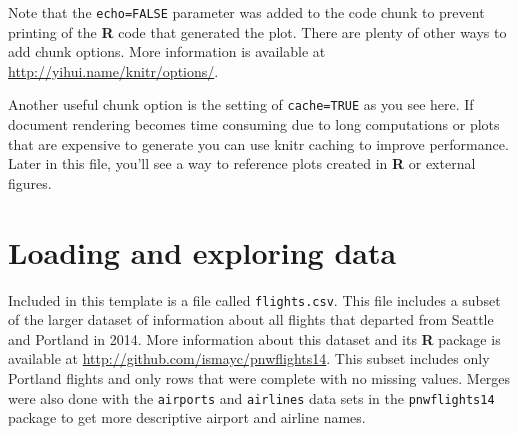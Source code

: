 \documentclass [11pt, proquest] {uwthesis}[2015/03/03]
\begin{document}
Note that the \texttt{echo=FALSE} parameter was added to the code chunk to prevent printing of the \textbf{R} code that generated the plot. There are plenty of other ways to add chunk options. More information is available at \url{http://yihui.name/knitr/options/}.

Another useful chunk option is the setting of \texttt{cache=TRUE} as you see here. If document rendering becomes time consuming due to long computations or plots that are expensive to generate you can use knitr caching to improve performance. Later in this file, you'll see a way to reference plots created in \textbf{R} or external figures.

\hypertarget{loading-and-exploring-data}{%
\section{Loading and exploring data}\label{loading-and-exploring-data}}

Included in this template is a file called \texttt{flights.csv}. This file includes a subset of the larger dataset of information about all flights that departed from Seattle and Portland in 2014. More information about this dataset and its \textbf{R} package is available at \url{http://github.com/ismayc/pnwflights14}. This subset includes only Portland flights and only rows that were complete with no missing values. Merges were also done with the \texttt{airports} and \texttt{airlines} data sets in the \texttt{pnwflights14} package to get more descriptive airport and airline names.
\end{document}

